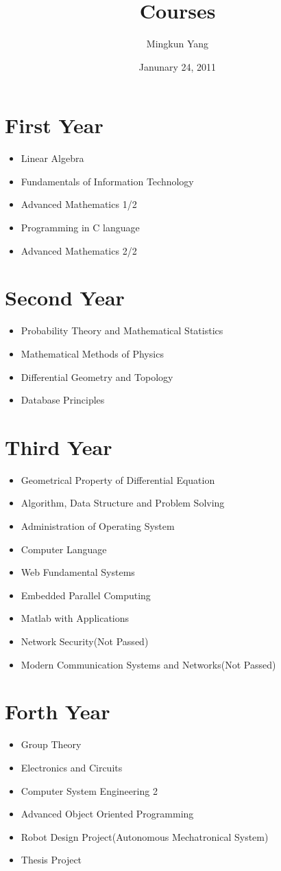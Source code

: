 \documentclass{article}
\begin{document}
\title{Courses}
\author{Mingkun Yang}
\date{Janunary 24, 2011}
\maketitle

\section{First Year}
\begin{itemize}
	\item
		Linear Algebra
	\item
		Fundamentals of Information Technology
	\item
		Advanced Mathematics 1/2
	\item
		Programming in C language
	\item
		Advanced Mathematics 2/2
\end{itemize}
\section{Second Year}
\begin{itemize}
	\item
		Probability Theory and Mathematical Statistics
	\item
		Mathematical Methods of Physics
	\item
		Differential Geometry and Topology
	\item
		Database Principles
\end{itemize}
\section{Third Year}
\begin{itemize}
	\item
		Geometrical Property of Differential Equation
	\item
		Algorithm, Data Structure and Problem Solving
	\item
		Administration of Operating System
	\item
		Computer Language
	\item
		Web Fundamental Systems
	\item
		Embedded Parallel Computing
	\item
		Matlab with Applications
	\item
		Network Security(Not Passed)
	\item
		Modern Communication Systems and Networks(Not Passed)
\end{itemize}
\section{Forth Year}
\begin{itemize}
	\item
		Group Theory
	\item
		Electronics and Circuits
	\item
		Computer System Engineering 2
	\item
		Advanced Object Oriented Programming
	\item
		Robot Design Project(Autonomous Mechatronical System)
	\item
		Thesis Project
\end{itemize}
\end{document}
